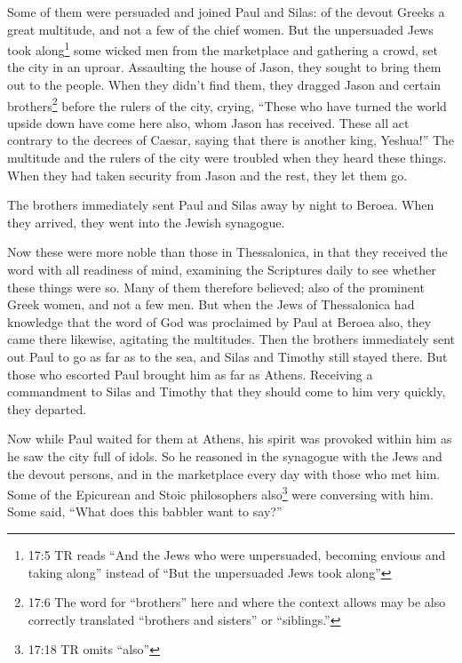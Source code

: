 \myverse{}Some of them were persuaded and joined Paul and Silas: of the
devout Greeks a great multitude, and not a few of the chief women.
\myverse{}But the unpersuaded Jews took along\footnote{17:5 TR reads “And the Jews who were unpersuaded, becoming envious and taking along” instead of “But
	the unpersuaded Jews took along”} some wicked men from the marketplace and gathering a crowd,
set the city in an uproar. Assaulting the house of Jason, they sought to bring them out to the people.
\myverse{}When they didn’t find them, they dragged Jason and certain brothers\footnote{17:6 The word for “brothers” here and where the context allows may be also correctly translated “brothers
	and sisters” or “siblings.”} before the rulers of the city, crying, “These who have turned the
world upside down have come here also,
\myverse{}whom Jason has received. These all act contrary to the decrees of Caesar, saying
that there is another king, Yeshua!”
\myverse{}The multitude and the rulers of the city were troubled when they heard these
things.
\myverse{}When they had taken security from Jason and the rest, they let them go.

\myverse{}The brothers immediately sent Paul and Silas away by night to
Beroea. When they arrived, they went into the Jewish synagogue.

\myverse{}Now these were more noble than those in Thessalonica, in that
they received the word with all readiness of mind, examining the Scriptures daily to see whether these
things were so.
\myverse{}Many of them therefore believed; also of the prominent Greek women, and not
a few men.
\myverse{}But when the Jews of Thessalonica had knowledge that the word of God was
proclaimed by Paul at Beroea also, they came there likewise, agitating the multitudes.
\myverse{}Then the brothers immediately sent out Paul to go as far as to the sea, and
Silas and Timothy still stayed there.
\myverse{}But those who escorted Paul brought him as far as Athens. Receiving a commandment
to Silas and Timothy that they should come to him very quickly, they departed.

\myverse{}Now while Paul waited for them at Athens, his spirit was provoked
within him as he saw the city full of idols.
\myverse{}So he reasoned in the synagogue with the Jews and the devout persons, and
in the marketplace every day with those who met him.
\myverse{}Some of the Epicurean and Stoic philosophers also\footnote{17:18 TR omits “also”
} were conversing with him. Some said, “What does this babbler want to say?”

